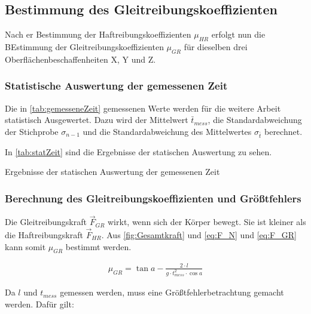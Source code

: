 \subsection{Bestimmung des Gleitreibungskoeffizienten}

Nach er Bestimmung der Haftreibungskoeffizienten $\mu_{HR}$ erfolgt nun die BEstimmung der Gleitreibungskoeffizienten $\mu_{GR}$ für dieselben drei Oberflächenbeschaffenheiten X, Y und Z.

\subsubsection{Statistische Auswertung der gemessenen Zeit}

Die in \autoref{tab:gemesseneZeit} gemessenen Werte werden für die weitere Arbeit statistisch Ausgewertet. Dazu wird der Mittelwert $\bar{t}_{mess}$, die Standardabweichung der Stichprobe $\sigma_{n-1}$ und die Standardabweichung des Mittelwertes $\sigma_{\bar{t}}$ berechnet.

In \autoref{tab:statZeit} sind die Ergebnisse der statischen Auswertung zu sehen.

\begin{table}[h]
    \center 
    \caption[Statistische Auswertung der gemessenen Zeit]{Ergebnisse der statischen Auswertung der gemessenen Zeit}
    
    \label{tab:statZeit}
\end{table}

\subsubsection{Berechnung des Gleitreibungskoeffizienten und Größtfehlers}

Die Gleitreibungskraft $\vec{F}_{GR}$ wirkt, wenn sich der Körper bewegt. Sie ist kleiner als die Haftreibungskraft $\vec{F}_{HR}$. Aus \autoref{fig:Gesamtkraft} und \autoref{eq:F_N} und \autoref{eq:F_GR} kann somit $\mu_{GR}$ bestimmt werden.

\begin{align}
  \mu_{GR} = \tan{a} - \frac{2\cdot l}{g \cdot t_{mess}^2 \cdot \cos{a}}
  \label{eq:muGR}
\end{align}

Da $l$ und $t_{mess}$ gemessen werden, muss eine Größtfehlerbetrachtung gemacht werden. Dafür gilt:

